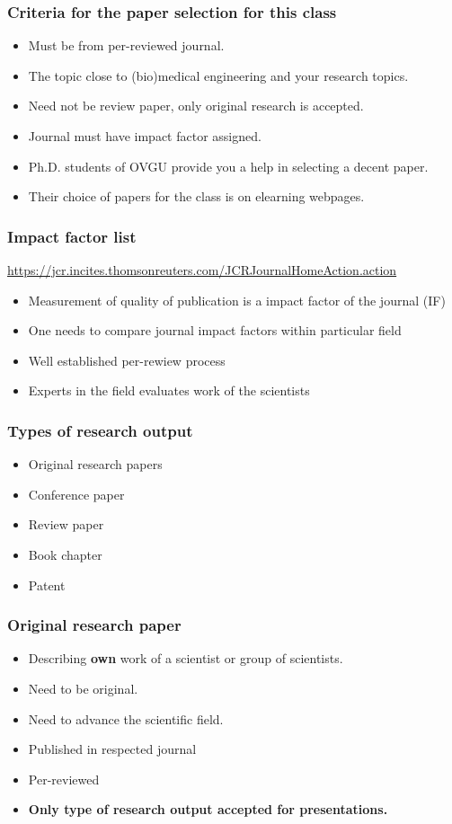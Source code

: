 \begin{frame}
\frametitle{Criteria for the paper selection for this class}
\begin{itemize}
\item Must be from per-reviewed journal.
\item The topic close to (bio)medical engineering and your research topics.
\item Need not be review paper, only original research is accepted.
\item Journal must have impact factor assigned.
\item Ph.D. students of OVGU provide you a help in selecting a decent paper.
\item Their choice of papers for the class is on elearning webpages.
\end{itemize}
\end{frame}

\begin{frame}
\frametitle{Impact factor list}
\scriptsize{\url{https://jcr.incites.thomsonreuters.com/JCRJournalHomeAction.action}}
\begin{itemize}
\item Measurement of quality of publication is a impact factor of the journal (IF)
\item One needs to compare journal impact factors within particular field
\item Well established per-rewiew process
\item Experts in the field evaluates work of the scientists
\end{itemize}
\end{frame}

\begin{frame}
\frametitle{Types of research output}
\begin{itemize}
\item Original research papers
\item Conference paper
\item Review paper
\item Book chapter
\item Patent
\end{itemize}
\end{frame}

\begin{frame}
\frametitle{Original research paper}
\begin{itemize}
\item Describing \textbf{own} work of a scientist or group of scientists.
\item Need to be original.
\item Need to advance the scientific field.
\item Published in respected journal
\item Per-reviewed
\item \textbf{Only type of research output accepted for presentations.}
\end{itemize}
\end{frame}

